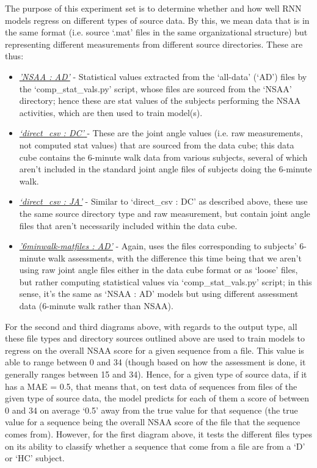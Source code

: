 \documentclass[12pt,twoside]{report}
\begin{document}
\quad The purpose of this experiment set is to determine whether and how well RNN models regress on different types of source data. By this, we mean data that is in the same format (i.e. source ‘.mat’ files in the same organizational structure) but representing different measurements from different source directories. These are thus:

\begin{itemize}
	\item \underline{\textit{'NSAA : AD'}} - Statistical values extracted from the ‘all-data’ (‘AD’) files by the ‘comp\_stat\_vals.py’ script, whose files are sourced from the ‘NSAA’ directory; hence these are stat values of the subjects performing the NSAA activities, which are then used to train model(s).
	\item \underline{\textit{‘direct\_csv : DC’ }} - These are the joint angle values (i.e. raw measurements, not computed stat values) that are sourced from the data cube; this data cube contains the 6-minute walk data from various subjects, several of which aren’t included in the standard joint angle files of subjects doing the 6-minute walk.
	\item \underline{\textit{‘direct\_csv : JA’}} - Similar to ‘direct\_csv : DC’ as described above, these use the same source directory type and raw measurement, but contain joint angle files that aren’t necessarily included within the data cube.
	\item \underline{\textit{'6minwalk-matfiles : AD'}} - Again, uses the files corresponding to subjects’ 6-minute walk assessments, with the difference this time being that we aren’t using raw joint angle files either in the data cube format or as ‘loose’ files, but rather computing statistical values via ‘comp\_stat\_vals.py’ script; in this sense, it’s the same as ‘NSAA : AD’ models but using different assessment data (6-minute walk rather than NSAA).
\end{itemize}

\quad For the second and third diagrams above, with regards to the output type, all these file types and directory sources outlined above are used to train models to regress on the overall NSAA score for a given sequence from a file. This value is able to range between 0 and 34 (though based on how the assessment is done, it generally ranges between 15 and 34). Hence, for a given type of source data, if it has a MAE = 0.5, that means that, on test data of sequences from files of the given type of source data, the model predicts for each of them a score of between 0 and 34 on average ‘0.5’ away from the true value for that sequence (the true value for a sequence being the overall NSAA score of the file that the sequence comes from). However, for the first diagram above, it tests the different files types on its ability to classify whether a sequence that come from a file are from a ‘D’ or ‘HC’ subject.
\end{document}
